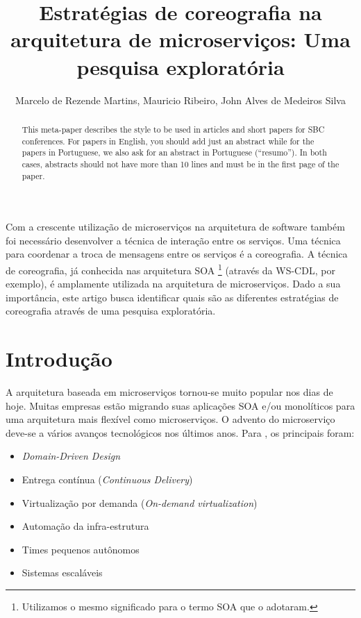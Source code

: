\documentclass[12pt]{article}
\title{Estratégias de coreografia na arquitetura de microserviços: Uma pesquisa exploratória}
\author{Marcelo de Rezende Martins\inst{1}, Mauricio Ribeiro\inst{1}, John Alves de Medeiros Silva\inst{1} }
\theoremstyle{plain}
\begin{document}
 

\maketitle

\begin{abstract}
  This meta-paper describes the style to be used in articles and short papers
  for SBC conferences. For papers in English, you should add just an abstract
  while for the papers in Portuguese, we also ask for an abstract in
  Portuguese (``resumo''). In both cases, abstracts should not have more than
  10 lines and must be in the first page of the paper.
\end{abstract}
     
\begin{resumo} 
  Com a crescente utilização de microserviços na arquitetura de software também foi necessário desenvolver a técnica de interação entre os serviços. Uma técnica para coordenar a troca de mensagens entre os serviços é a coreografia. A técnica de coreografia, já conhecida nas arquitetura SOA \footnote{Utilizamos o mesmo significado para o termo SOA que o \cite{martinfowler-microservices:2014} adotaram.} (através da WS-CDL, por exemplo), é amplamente utilizada na arquitetura de microserviços. Dado a sua importância, este artigo busca identificar quais são as diferentes estratégias de coreografia através de uma pesquisa exploratória. 
\end{resumo}


\section{Introdução}
\label{sec:introducao}

A arquitetura baseada em microserviços tornou-se muito popular nos dias de hoje. Muitas empresas estão migrando suas aplicações SOA \footnotemark[1] e/ou monolíticos para uma arquitetura mais flexível como microserviços. O advento do microserviço deve-se a vários avanços tecnológicos nos últimos anos. Para \cite{Newman:15}, os principais foram:
\begin{itemize}
    \item \textit{Domain-Driven Design}
    \item Entrega contínua (\textit{Continuous Delivery})
    \item Virtualização por demanda (\textit{On-demand virtualization})
    \item Automação da infra-estrutura
    \item Times pequenos autônomos
    \item Sistemas escaláveis
\end{itemize}
\end{document}
